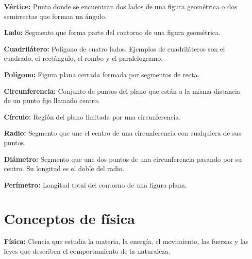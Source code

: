 \documentclass[12pt,final]{report}
\theoremstyle{plain}
\theoremstyle{definition}
\begin{document}
\vspace{0.5em}

\textbf{Vértice:} Punto donde se encuentran dos lados de una figura geométrica o dos semirrectas que forman un ángulo.

\vspace{0.5em}

\textbf{Lado:} Segmento que forma parte del contorno de una figura geométrica.

\vspace{0.5em}

\textbf{Cuadrilátero:} Polígono de cuatro lados. Ejemplos de cuadriláteros son el cuadrado, el rectángulo, el rombo y el paralelogramo.

\vspace{0.5em}

\textbf{Polígono:} Figura plana cerrada formada por segmentos de recta.

\vspace{0.5em}

\textbf{Circunferencia:} Conjunto de puntos del plano que están a la misma distancia de un punto fijo llamado centro.

\vspace{0.5em}

\textbf{Círculo:} Región del plano limitada por una circunferencia.

\vspace{0.5em}

\textbf{Radio:} Segmento que une el centro de una circunferencia con cualquiera de sus puntos.

\vspace{0.5em}

\textbf{Diámetro:} Segmento que une dos puntos de una circunferencia pasando por su centro. Su longitud es el doble del radio.

\vspace{0.5em}

\textbf{Perímetro:} Longitud total del contorno de una figura plana.

\section*{Conceptos de física}

\vspace{0.5em}

\textbf{Física:} Ciencia que estudia la materia, la energía, el movimiento, las fuerzas y las leyes que describen el comportamiento de la naturaleza.
\end{document}
